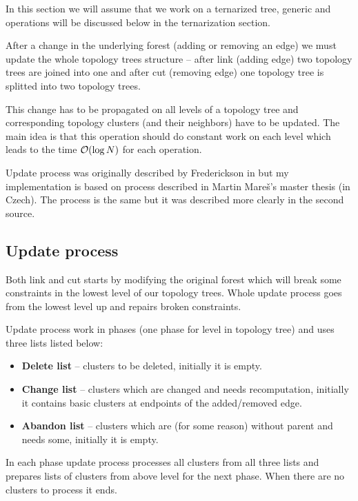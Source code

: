 In this section we will assume that we work on a ternarized tree, generic \Cut{}
and \Link{} operations will be discussed below in the ternarization section.

After a change in the underlying forest (adding or removing an edge) we must
update the whole topology trees structure -- after {\I link} (adding edge) two
topology trees are joined into one and after {\I cut} (removing edge) one
topology tree is splitted into two topology trees.

This change has to be propagated on all levels of a topology tree and
corresponding topology clusters (and their neighbors) have to be updated. The
main idea is that this operation should do constant work on each level which
leads to the time ${\cal O}(\log N)$ for each operation.

Update process was originally described by Frederickson in
\cite{DSforDynamicallyMaintainingRootedTrees} but my implementation is based on
process described in Martin Mareš's master thesis \cite{DGA} (in Czech). The
process is the same but it was described more clearly in the second source.

\subsection{Update process}

Both link and cut starts by modifying the original forest which will break some
constraints in the lowest level of our topology trees. Whole update process
goes from the lowest level up and repairs broken constraints.

Update process work in phases (one phase for level in topology tree) and uses
three lists listed below:
\begin{itemize}
\item {\bf Delete list} -- clusters to be deleted, initially it is empty.
\item {\bf Change list} -- clusters which are changed and needs recomputation, initially
it contains basic clusters at endpoints of the added/removed edge.
\item {\bf Abandon list} -- clusters which are (for some reason) without parent and
needs some, initially it is empty.
\end{itemize}

In each phase update process processes all clusters from all three lists and
prepares lists of clusters from above level for the next phase. When there are
no clusters to process it ends.

